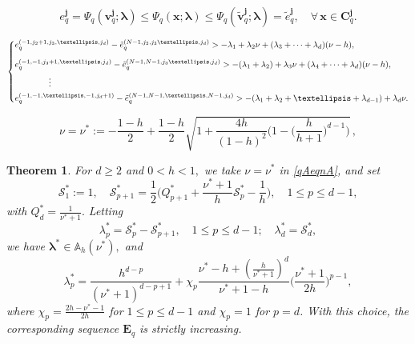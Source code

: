 \documentclass[10pt,a4paper]{amsart}
\newtheorem{theorem}{Theorem}
\newcommand{\bs}[1]{\boldsymbol{#1}}
\begin{document}
\begin{equation}\label{mon-hyperb}
e_q^{\bs j}=\Psi_q(\bs v_q^{\bs j};\bs \lambda)  \le \Psi_q(\bs x;\bs \lambda) \le  \Psi_q(\tilde{\bs v}_q^{\bs j};\bs \lambda)=\tilde e_q^{\bs j},\quad \forall\, \bs x\in \bs C_q^{\bs j}.
\end{equation}

\begin{equation}\label{secondcondforanydd}
\begin{dcases}
 e_q^{(-1,j_2+1,j_3,\ldots,j_d)}-\tilde e_q^{(N-1,j_2,j_3\ldots,j_d)}
>-\lambda_1+\lambda_2\nu+(\lambda_3+\cdots+\lambda_d)(\nu-h),
  \\[6pt]
e_q^{(-1,-1,j_3+1,\ldots,j_d)}-\tilde e_q^{(N-1,N-1,j_3\ldots,j_d)}>-(\lambda_1+\lambda_2)+\lambda_3\nu+(\lambda_4+\cdots+\lambda_d)(\nu-h), \\
\qquad \qquad \vdots\\
e_q^{(-1,-1,\ldots,-1,j_d+1)}-\tilde e_q^{(N-1,N-1,\ldots,N-1,j_d)}>-(\lambda_1+\lambda_2+\ldots+\lambda_{d-1})+\lambda_d\nu.
\end{dcases}
\end{equation}

\begin{equation}\label{qAeqnA} 
 \nu=\nu^*:=-\frac{1-h}{2}+ \frac{1-h}{2}\sqrt{1+ \frac 
    {4h}{(1-h)^2}\Big(1 - \Big(\frac{h}{h+1}\Big)^{d-1}\Big)}\,,
\end{equation}

\begin{theorem}\label{Hypercube-Sep} For $d\ge 2$ and   $0<h<1,$ we take $\nu=\nu^*$ in \eqref{qAeqnA}, and set 
\begin{equation}\label{Spcurrent}
{\mathcal S}_1^*:=1,\quad {\mathcal S}_{p+1}^*=\frac{1}{2}\Big(Q^*_{p+1}+\frac{\nu^*+1}{h}{\mathcal S}_p^*-\frac{1}{h}\Big),\quad 1\le p\le d-1,
\end{equation}
with $Q_d^*=\tfrac 1 {\nu^*+1}.$ Letting 
\begin{equation}\label{lmdpS}
    \lambda_p^*={\mathcal S}_p^*-{\mathcal S}_{p+1}^*,\quad 1\le p\le d-1;\quad \lambda_d^*={\mathcal S}_d^*,
\end{equation}
we have $\bs \lambda^*\in {\mathbb A}_h(\nu^*),$ and 
\begin{equation}\label{def_d_lambda}
    \lambda_p^*=
        \frac{h^{d-p}}{(\nu^*+1)^{d-p+1}}+\chi_p\frac{\nu^*-h+(\frac{h}{\nu^*+1})^d}{\nu^*+1-h}\Big(\frac{\nu^*+1}{2h}\Big)^{p-1},
\end{equation}
where $\chi_p=\tfrac{2h-\nu^*-1}{2h}$ for $1\le p\le d-1$ and $\chi_p=1$ for $p=d$.
With this choice, the corresponding sequence $\bs E_q$ is strictly increasing. 
\end{theorem}
\end{document}
